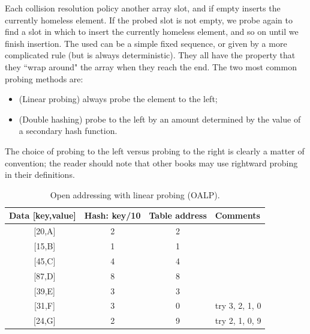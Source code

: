 Each collision resolution policy  another array slot, and if 
empty inserts the currently homeless element. If the probed slot is not empty, we probe 
again to find a slot in which to insert the currently homeless element, and so on 
until we finish insertion. The  used can be a simple 
fixed sequence, or given by a more complicated rule (but is always deterministic).
They all have the property that they ``wrap around" the array when they reach the 
end. The two most common probing methods are:
\begin{itemize}
\item (Linear probing) always probe the element to the left;
\item (Double hashing) probe to the left by an amount determined by the value of 
a secondary hash function.
\end{itemize}

\begin{note}
The choice of probing to the left versus probing to the right is clearly a 
matter of convention; the reader should note that other books may use rightward
probing in their definitions.
\end{note}

\begin{table}[hbt]
\begin{center}
\caption{Open addressing with linear probing (OALP).}\label{hash-lin} 
\begin{tabular}{|c|c|c|l|} \hline 
\textbf{Data} [key,value] & \textbf{Hash}: key/10 & \textbf{Table address} & \textbf{Comments} \\ \hline
~[20,A] & 2 & 2 & \\
~[15,B] & 1 & 1 & \\
~[45,C] & 4 & 4 & \\
~[87,D] & 8 & 8 & \\
~[39,E] & 3 & 3 & \\
~[31,F] & 3 & 0 & try 3, 2, 1, 0 \\
~[24,G] & 2 & 9 & try 2, 1, 0, 9 \\ \hline
\end{tabular}
\end{center}
\end{table}

